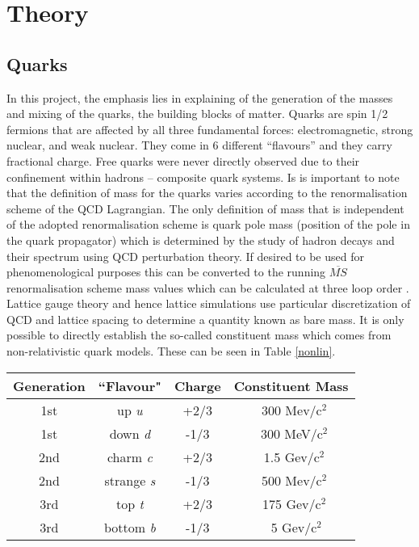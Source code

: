 \chapter{Theory}
\section{Quarks}
In this project, the emphasis lies in explaining of the generation of the masses and mixing of the quarks, the building blocks of matter. Quarks are spin 1/2 fermions that are affected by all three fundamental forces: electromagnetic, strong nuclear, and weak nuclear. They come in 6 different ``flavours'' and they carry fractional charge. Free quarks were never directly observed due to their confinement within hadrons -- composite quark systems. Is is important to note that the definition of mass for the quarks varies according to the renormalisation scheme of the QCD Lagrangian. The only definition of mass that is independent of the adopted renormalisation scheme is quark pole mass (position of the pole in the quark propagator) which is determined by the study of hadron decays and their spectrum using QCD perturbation theory. If desired to be used for phenomenological purposes this can be converted to the running  $\overline{MS}$ renormalisation scheme mass values which can be calculated at three loop order \cite{threepole}. Lattice gauge theory and hence lattice simulations use particular discretization of QCD and lattice spacing to determine a quantity known as bare mass. It is only possible to directly establish the so-called constituent mass which comes from non-relativistic quark models. These can be seen in Table \ref{nonlin}.

\begin{table*} 

\centering %
\begin{tabular}{|c|c|c|c|} %
\hline %
Generation & ``Flavour" & Charge & Constituent Mass \\ [0.5ex]\hline%
\hline %
1st & up  \textit{u}& +2/3 & ~300 Mev/c$^{2}$ \\ %
1st & down \textit{d}& -1/3 &  ~300 MeV/c$^{2}$ \\[1ex]
2nd & charm \textit{c}& +2/3 &  ~1.5 Gev/c$^{2}$\\ 
2nd & strange \textit{s}& -1/3 &  ~500 Mev/c$^{2}$ \\[1ex]
3rd & top \textit{t}& +2/3 &  ~175 Gev/c$^{2}$ \\ 
3rd & bottom \textit{b}& -1/3 & ~ 5 Gev/c$^{2}$ \\ [1ex] %
\hline %

\end{tabular} 
\caption{Quarks and their properties} 
\label{nonlin} %
\end{table*} 

